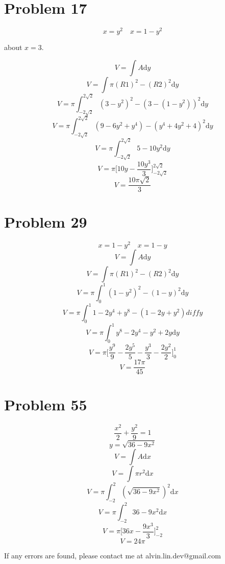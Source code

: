 \documentclass[letterpaper, 12pt]{article}
\newcommand*{\diff}{\mathrm{d}}
\begin{document}
\section*{Problem 17}
\[ x = y^{2} \quad x = 1-y^{2} \]
\begin{center}
  about \( x = 3 \).
\end{center}
\[ V = \int{A\diff{y}} \]
\[ V = \int{\pi(R1)^{2}-(R2)^{2}\diff{y}} \]
\[ V = \pi\int_{-2\sqrt{2}}^{2\sqrt{2}}
       {(3-y^{2})^{2}-(3-(1-y^{2}))^{2}\diff{y}} \]
\[ V = \pi\int_{-2\sqrt{2}}^{2\sqrt{2}}
       {(9-6y^{2}+y^{4})-(y^{4}+4y^{2}+4)^{2}\diff{y}} \]
\[ V = \pi\int_{-2\sqrt{2}}^{2\sqrt{2}}{5-10y^{2}\diff{y}} \]
\[ V = \pi\bigg[10y-\frac{10y^{3}}{3}\bigg]_{-2\sqrt{2}}^{2\sqrt{2}} \]
\[ V = \frac{10\pi\sqrt{2}}{3} \]

\section*{Problem 29}
\[ x = 1-y^{2} \quad x=1-y \]
\[ V = \int{A\diff{y}} \]
\[ V = \int{\pi(R1)^{2}-(R2)^{2}\diff{y}} \]
\[ V = \pi\int_{0}^{1}{(1-y^{2})^{2}-(1-y)^{2}\diff{y}} \]
\[ V = \pi\int_{0}^{1}{1-2y^{4}+y^{8}-(1-2y+y^{2})diff{y}} \]
\[ V = \pi\int_{0}^{1}{y^{8}-2y^{4}-y^{2}+2y\diff{y}} \]
\[ V = \pi\bigg[\frac{y^{9}}{9}-\frac{2y^{5}}{5}-
       \frac{y^{3}}{3}-\frac{2y^{2}}{2}\bigg]_{0}^{1} \]
\[ V = \frac{17\pi}{45} \]

\section*{Problem 55}
\[ \frac{x^{2}}{2}+\frac{y^{2}}{9} = 1 \]
\[ y = \sqrt{36-9x^{2}} \]
\[ V = \int{A\diff{x}} \]
\[ V = \int{\pi r^{2}\diff{x}} \]
\[ V = \pi\int_{-2}^{2}{(\sqrt{36-9x^{2}})^{2}\diff{x}} \]
\[ V = \pi\int_{-2}^{2}{36-9x^{2}\diff{x}} \]
\[ V = \pi\bigg[36x-\frac{9x^{3}}{3}\bigg]_{-2}^{2} \]
\[ V = 24\pi \]

\begin{center}
  If any errors are found, please contact me at alvin.lin.dev@gmail.com
\end{center}
\end{document}

